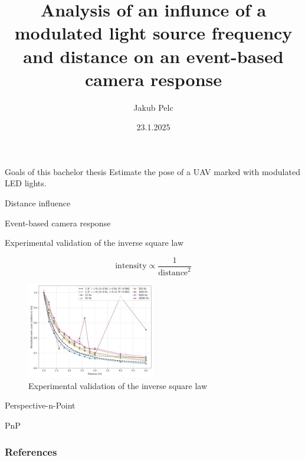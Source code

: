 \documentclass{beamer}
\title{Analysis of an influnce of a modulated light source frequency
and distance on an event-based camera response}
\date{23.1.2025}
\author{Jakub Pelc}
\institute{Faculty of Electrical Engineering, Czech Technical University in Prague}
\begin{document}
	\maketitle

	\begin{frame}{Goals of this bachelor thesis}
	Estimate the pose of a UAV marked with modulated LED lights.
	\end{frame}

	\begin{frame}{Distance influence}


	\end{frame}

	\begin{frame}{Event-based camera response}
	\end{frame}

	\begin{frame}[allowframebreaks]{Experimental validation of the inverse square law}

		\begin{equation}
			\text{intensity} \propto \frac{1}{\text{distance}^2}
		\end{equation}

		\begin{figure}
			\centering
			\includegraphics[width=0.50\textwidth]{../fig/pgfplot/build/inv_square.pdf}
			\caption{Experimental validation of the inverse square law}
			\label{fig:fit1}
		\end{figure}

	\end{frame}

	\begin{frame}{Perspective-n-Point}

	\end{frame}

	\begin{frame}{PnP}

	\end{frame}

	\begin{frame}[shrink=20]
		\frametitle{References}
		\begingroup
		\tiny
		\printbibliography[heading=none]
		\endgroup

		
	\end{frame}
\end{document}
